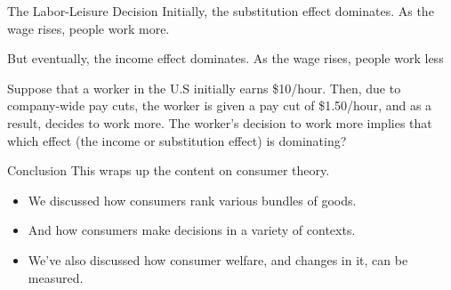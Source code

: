 \documentclass[11pt,t]{beamer}
\begin{document}
\begin{frame}{The Labor-Leisure Decision}
  Initially, the substitution effect dominates. As the wage rises, people work more.
  
  \bigskip 
  But eventually, the income effect dominates. As the wage rises, people work less
\end{frame}

\begin{frame}
  
  \bigskip
  Suppose that a worker in the U.S initially earns \$10/hour. Then, due to company-wide pay cuts, the worker is given a pay cut of \$1.50/hour, and as a result, decides to work more. The worker's decision to work more implies that which effect (the income or substitution effect) is dominating?
\end{frame}

\begin{frame}{Conclusion}
  This wraps up the content on consumer theory.

  \bigskip
  \begin{itemize}
    \item We discussed how consumers rank various bundles of goods.

    \item  And how consumers make decisions in a variety of contexts.

    \item We've also discussed how consumer welfare, and changes in it, can be measured.
  \end{itemize}
\end{frame}
\end{document}
